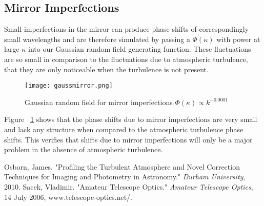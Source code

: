 \documentclass[%
 reprint,
 amsmath,amssymb,
 aps,
 pra,
]{revtex4-1}
\begin{document}
{\subsection{Mirror Imperfections} \label{subsec:mirror-issues}
Small imperfections in the mirror can produce phase shifts of correspondingly small wavelengths and are therefore simulated by passing a $\Phi(\kappa)$ with power at large $\kappa$ into our Gaussian random field generating function. These fluctuations are so small in comparison to the fluctuations due to atmospheric turbulence, that they are only noticeable when the turbulence is not present.
\begin{figure}[H]
  \centering
    \texttt{[image: gaussmirror.png]}
\caption{Gaussian random field for mirror imperfections $\Phi(\kappa)\propto k^{-0.0001} $}
\label{fig:mirror}
\end{figure}

Figure ~\ref{fig:mirror} shows that the phase shifts due to mirror imperfections are very small and lack any structure when compared to the atmospheric turbulence phase shifts. This verifies that shifts due to mirror imperfections will only be a major problem in the absence of atmospheric turbulence.

\begin{thebibliography}{9}
 Osborn, James. "Profiling the Turbulent Atmosphere and Novel Correction Techniques for Imaging and Photometry in Astronomy." \textit{Durham University}, 2010. %
 Sacek, Vladimir. "Amateur Telescope Optics." \textit{Amateur Telescope Optics}, 14 July 2006, www.telescope-optics.net/. %
\end{thebibliography}

}
\end{document}
